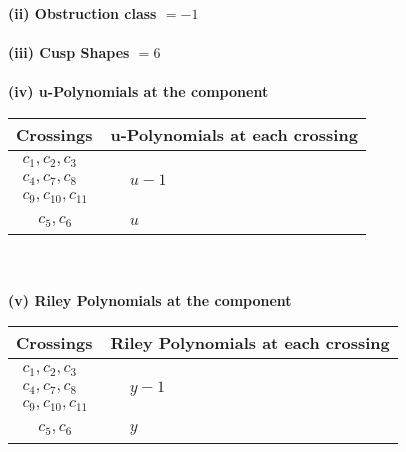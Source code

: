 \documentclass[1p]{elsarticle_modified}
\theoremstyle{definition}
\begin{document}
\flushleft \textbf{(ii) Obstruction class $= -1$}\\~\\
\flushleft \textbf{(iii) Cusp Shapes $= 6$}\\~\\
\newpage\renewcommand{\arraystretch}{1}
\flushleft \textbf{(iv) u-Polynomials at the component}\newline \\
\begin{tabular}{m{50pt}|m{274pt}}
Crossings & \hspace{64pt}u-Polynomials at each crossing \\
\hline $$\begin{aligned}c_{1},c_{2},c_{3}\\c_{4},c_{7},c_{8}\\c_{9},c_{10},c_{11}\end{aligned}$$&$\begin{aligned}
&u-1
\end{aligned}$\\
\hline $$\begin{aligned}c_{5},c_{6}\end{aligned}$$&$\begin{aligned}
&u
\end{aligned}$\\
\hline
\end{tabular}\\~\\
\newpage\renewcommand{\arraystretch}{1}
\flushleft \textbf{(v) Riley Polynomials at the component}\newline \\
\begin{tabular}{m{50pt}|m{274pt}}
Crossings & \hspace{64pt}Riley Polynomials at each crossing \\
\hline $$\begin{aligned}c_{1},c_{2},c_{3}\\c_{4},c_{7},c_{8}\\c_{9},c_{10},c_{11}\end{aligned}$$&$\begin{aligned}
&y-1
\end{aligned}$\\
\hline $$\begin{aligned}c_{5},c_{6}\end{aligned}$$&$\begin{aligned}
&y
\end{aligned}$\\
\hline
\end{tabular}\\~\\
\end{document}
